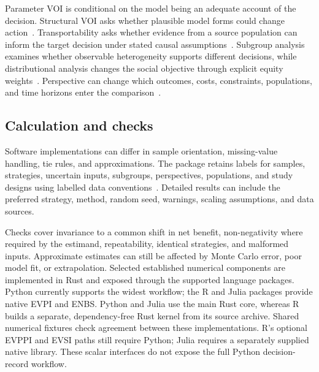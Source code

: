 Parameter VOI is conditional on the model being an adequate account of the
decision. Structural VOI asks whether plausible model forms could change
action~\cite{jackson2011structural}. Transportability asks whether evidence
from a source population can inform the target decision under stated causal
assumptions~\cite{bareinboim2016datafusion}. Subgroup analysis examines whether
observable heterogeneity supports different decisions, while distributional
analysis changes the social objective through explicit equity
weights~\cite{espinoza2014heterogeneity,asaria2016distributional}. Perspective can
change which outcomes, costs, constraints, populations, and time horizons enter
the comparison~\cite{mordaunt2025vop}.

\subsection{Calculation and checks}

Software implementations can differ in sample orientation, missing-value
handling, tie rules, and approximations. The package retains labels for samples,
strategies, uncertain inputs, subgroups, perspectives, populations, and study
designs using labelled data conventions~\cite{hoyer2017xarray}.
Detailed results can include the preferred strategy, method, random seed,
warnings, scaling assumptions, and data sources.

Checks cover invariance to a common shift in net benefit, non-negativity where
required by the estimand, repeatability, identical strategies, and malformed
inputs. Approximate estimates can still be affected by Monte Carlo error, poor
model fit, or extrapolation. Selected established numerical components are
implemented in Rust and exposed through the supported language packages.
Python currently supports the widest workflow; the R and Julia packages
provide native EVPI and ENBS\@. Python and Julia use the main Rust core, whereas
R builds a separate, dependency-free Rust kernel from its source archive.
Shared numerical fixtures check agreement between these implementations.
R's optional EVPPI and EVSI paths still require Python; Julia requires a
separately supplied native library. These scalar interfaces do not expose the
full Python decision-record workflow.
